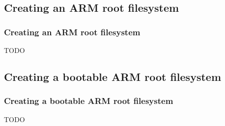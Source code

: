 \documentclass{beamer}
\begin{document}
\subsection{Creating an ARM root filesystem}
\begin{frame}
  \frametitle{Creating an ARM root filesystem}
  \begin{center}
    TODO
  \end{center}
\end{frame}
\subsection{Creating a bootable ARM root filesystem}
\begin{frame}
  \frametitle{Creating a bootable ARM root filesystem}
  \begin{center}
    TODO
  \end{center}
\end{frame}
\end{document}
